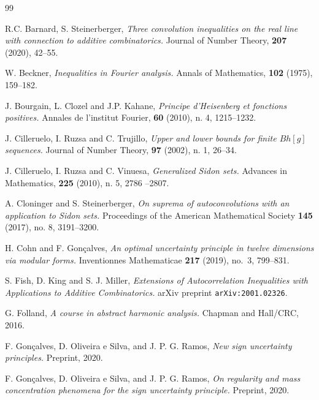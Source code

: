 \documentclass[11pt, reqno]{amsart}
\numberwithin{equation}{section}
\begin{document}
\begin{thebibliography}{99}

\newblock R.C. Barnard, S. Steinerberger,
\newblock \emph{Three convolution inequalities on the real line with connection to additive combinatorics.}
\newblock Journal of Number Theory, \textbf{207} (2020), 42--55. 

\newblock W. Beckner, 
\newblock \emph{Inequalities in Fourier analysis.} 
\newblock  Annals of Mathematics, \textbf{102} (1975), 159--182. 

\newblock  J. Bourgain, L. Clozel and J.P. Kahane, 
\newblock \emph{Principe d’Heisenberg et fonctions positives.}
\newblock Annales de l’institut Fourier, \textbf{60} (2010), n. 4, 1215--1232.

\newblock J. Cilleruelo, I. Ruzsa and C. Trujillo,
\newblock \emph{Upper and lower bounds for finite $Bh[g]$ sequences.}
\newblock Journal of Number Theory, \textbf{97} (2002), n. 1, 26--34.

\newblock J. Cilleruelo, I. Ruzsa and C. Vinuesa,
\newblock \emph{Generalized Sidon sets.}
\newblock Advances in Mathematics, \textbf{225} (2010), n. 5, 2786 --2807.

\newblock A. Cloninger and S. Steinerberger, 
\newblock \emph{On suprema of autoconvolutions with an application to Sidon sets.}
\newblock Proceedings of the American Mathematical Society \textbf{145} (2017), no. 8, 3191--3200.

\newblock H. Cohn and F. Gon\c{c}alves,
\newblock \emph{An optimal uncertainty principle in twelve dimensions via modular forms.}
\newblock Inventionnes Mathematicae {\bf 217} (2019), no.~3, 799--831. 

\newblock S. Fish, D. King and S. J. Miller,  
\newblock \emph{Extensions of Autocorrelation Inequalities with Applications to Additive Combinatorics.}
\newblock arXiv preprint \texttt{arXiv:2001.02326}. 

\newblock G. Folland, 
\newblock \emph{A course in abstract harmonic analysis.} 
\newblock Chapman and Hall/CRC, 2016. 

\newblock F. Gon\c{c}alves, D. Oliveira e Silva, and J. P. G. Ramos, 
\newblock \emph{New sign uncertainty principles.}
\newblock Preprint, 2020.

\newblock F. Gon\c{c}alves, D. Oliveira e Silva, and J. P. G. Ramos, 
\newblock \emph{On regularity and mass concentration phenomena for the sign uncertainty principle.}
\newblock Preprint, 2020.


\end{thebibliography}
\end{document}

